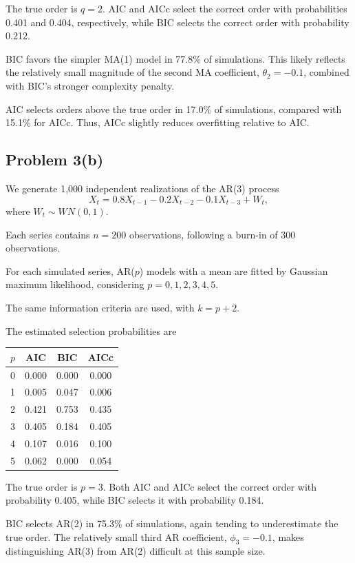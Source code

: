 \documentclass[11pt]{article}
\begin{document}
The true order is \(q=2\). AIC and
AICc select the correct order with
probabilities 0.401 and 0.404,
respectively, while BIC selects
the correct order with probability 0.212.

BIC favors the simpler MA(1) model
in 77.8\% of simulations. This likely
reflects the relatively small magnitude
of the second MA coefficient,
\(\theta_2=-0.1\), combined with
BIC's stronger complexity penalty.

AIC selects orders above the true
order in 17.0\% of simulations,
compared with 15.1\% for AICc.
Thus, AICc slightly reduces
overfitting relative to AIC.

\subsection*{Problem 3(b)}

We generate 1,000 independent realizations
of the AR(3) process
\[
X_t=0.8X_{t-1}-0.2X_{t-2}
-0.1X_{t-3}+W_t,
\]
where \(W_t\sim WN(0,1)\).

Each series contains \(n=200\) observations,
following a burn-in of 300 observations.

For each simulated series, AR(\(p\))
models with a mean are fitted by Gaussian
maximum likelihood, considering
\(p=0,1,2,3,4,5\).

The same information criteria are used,
with \(k=p+2\).

The estimated selection probabilities are

\begin{center}
\begin{tabular}{cccc}
\hline
\(p\) & AIC & BIC & AICc\\
\hline
0 & 0.000 & 0.000 & 0.000\\
1 & 0.005 & 0.047 & 0.006\\
2 & 0.421 & 0.753 & 0.435\\
3 & 0.405 & 0.184 & 0.405\\
4 & 0.107 & 0.016 & 0.100\\
5 & 0.062 & 0.000 & 0.054\\
\hline
\end{tabular}
\end{center}

The true order is \(p=3\). Both AIC
and AICc select the correct order
with probability 0.405, while BIC
selects it with probability 0.184.

BIC selects AR(2) in 75.3\% of
simulations, again tending to
underestimate the true order.
The relatively small third AR
coefficient, \(\phi_3=-0.1\),
makes distinguishing AR(3) from
AR(2) difficult at this sample size.
\end{document}
